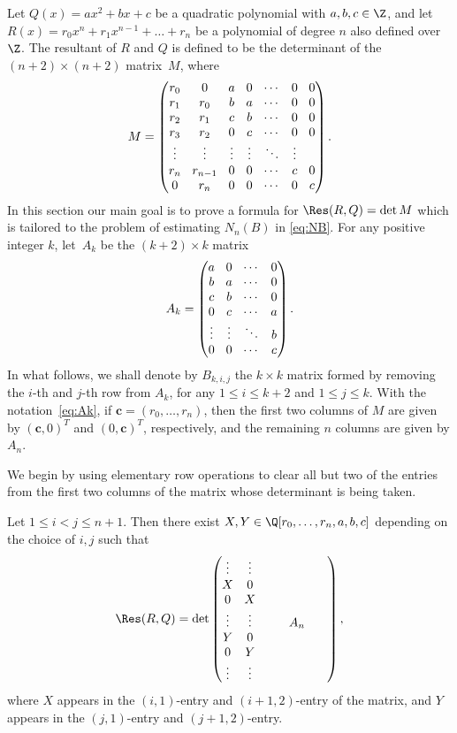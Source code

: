 Let $Q(x)=ax^2+bx+c$ be a quadratic polynomial with $a,b,c\in \Z$, and let
$R(x)=r_0x^n+r_1x^{n-1}+\dots+r_n$ be a polynomial of degree $n$ also defined over $\Z$.
The resultant of $R$ and $Q$ is defined to be
the determinant of the $(n+2)\times (n+2)$ matrix~$M$, where
\[\arraycolsep4.5pt
M=
\begin{pmatrix}
r_0 & 0& a& 0& \cdots & 0 & 0 \\
r_1& r_0 &b& a& \cdots& 0& 0 \\
r_2& r_1&c& b& \cdots & 0& 0\\
r_3 &r_2&0& c& \cdots & 0& 0 \\
\vdots&\vdots& \vdots&\vdots & \ddots & \vdots \\
r_n& r_{n-1}& 0& 0& \cdots & c& 0\\
0& r_n& 0& 0& \cdots & 0 & c
\end{pmatrix}.
\]
In this section our main goal is to prove a formula for
$\Res(R,Q)=\det M$ which is tailored to the problem of estimating $N_n(B)$ in \eqref{eq:NB}.
For any positive integer $k$, let~$A_k$ be the $(k+2)\times k$ matrix
\begin{equation}\label{eq:Ak} \arraycolsep4.5pt
A_k=
\begin{pmatrix}
a& 0& \cdots & 0 \\
b& a& \cdots& 0 \\
c& b& \cdots & 0\\
0& c& \cdots & a \\
\vdots&\vdots & \ddots & b \\
0& 0&\cdots & c
\end{pmatrix}.\end{equation}
In what follows, we shall denote by $B_{k,i,j}$ the $k\times k$ matrix formed by removing the $i$-th and $j$-th row from $A_{k}$, for any $1\leq i\leq k+2$ and $1\leq j\leq k$.
With the notation~\eqref{eq:Ak}, if
$\boldsymbol{c}=(r_0,\dots, r_n)$, then the first two columns of $M$
are given by $(\boldsymbol{c},0)^T$ and $(0,\boldsymbol{c})^T$,
respectively,
and the remaining $n$ columns are given by $A_n$.

We begin by using elementary row operations to clear all but two of the entries from the first two columns of the matrix whose determinant is being taken.

\begin{lemma}\label{lem:res1}
Let $1\leq i<j\leq n+1$. Then there exist $X,Y\in\Q[r_0,\dots, r_n,a,b,c]$ depending on the choice of $i,j$ such that
\[\arraycolsep4.5pt
\Res(R,Q)=
\det
\begin{pmatrix}
\vdots & \vdots & &&&& \\
X & 0 & &&&&\\
0 & X & &&&&\\
\vdots & \vdots &&&A_n&& \\
Y & 0 & &&&&\\
0 & Y & &&&&\\
\vdots & \vdots & &&&&
\end{pmatrix},
\]
where $X$ appears in the $(i,1)$-entry and $(i+1,2)$-entry of the matrix, and $Y$ appears in the $(j,1)$-entry and $(j+1,2)$-entry.
\end{lemma}

